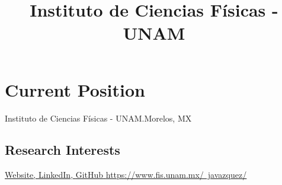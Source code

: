 \documentclass[12pt,a4paper]{moderncv}
\title{Instituto de Ciencias F\'isicas - UNAM}
\def\blue{\textcolor{black!10!red!70!}}
\begin{document}
\maketitle
%
\vspace{0.5cm}


\section{Current Position}
\vspace{1.em}

{Instituto de Ciencias F\'isicas - UNAM.}{Morelos, MX}{}{}{}
\vspace{1.em}


\subsection{Research Interests}
\vspace{0.5em}

 \href{https://www.fis.unam.mx/~javazquez/}{\blue{\underline{Website}}, 
		\href{https://www.linkedin.com/in/jalbertovazquez}{\blue{\underline{LinkedIn}}}, 
		\href{https://github.com/ja-vazquez}{\blue{\underline{GitHub}}} \hfill
 \underline{https://www.fis.unam.mx/~javazquez/}
	 }
	 
\end{document}
